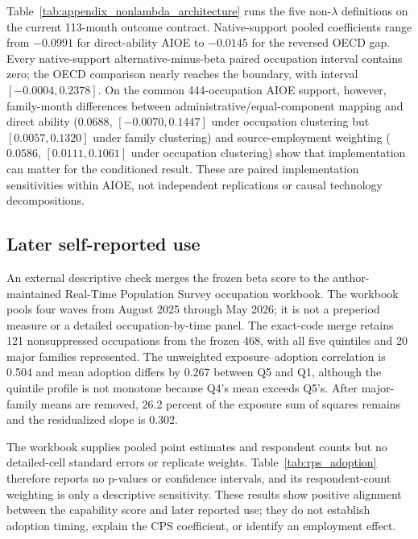 Table~\ref{tab:appendix_nonlambda_architecture} runs the five non-$\lambda$ definitions on the current 113-month outcome contract.  Native-support pooled coefficients range from $-0.0991$ for direct-ability AIOE to $-0.0145$ for the reversed OECD gap.  Every native-support alternative-minus-beta paired occupation interval contains zero; the OECD comparison nearly reaches the boundary, with interval $[-0.0004,0.2378]$.  On the common 444-occupation AIOE support, however, family-month differences between administrative/equal-component mapping and direct ability ($0.0688$, $[-0.0070,0.1447]$ under occupation clustering but $[0.0057,0.1320]$ under family clustering) and source-employment weighting ($0.0586$, $[0.0111,0.1061]$ under occupation clustering) show that implementation can matter for the conditioned result.  These are paired implementation sensitivities within AIOE, not independent replications or causal technology decompositions.









\subsection{Later self-reported use}

An external descriptive check merges the frozen beta score to the author-maintained Real-Time Population Survey occupation workbook.  The workbook pools four waves from August 2025 through May 2026; it is not a preperiod measure or a detailed occupation-by-time panel.  The exact-code merge retains 121 nonsuppressed occupations from the frozen 468, with all five quintiles and 20 major families represented.  The unweighted exposure--adoption correlation is 0.504 and mean adoption differs by 0.267 between Q5 and Q1, although the quintile profile is not monotone because Q4's mean exceeds Q5's.  After major-family means are removed, 26.2 percent of the exposure sum of squares remains and the residualized slope is 0.302.

The workbook supplies pooled point estimates and respondent counts but no detailed-cell standard errors or replicate weights.  Table~\ref{tab:rps_adoption} therefore reports no p-values or confidence intervals, and its respondent-count weighting is only a descriptive sensitivity.  These results show positive alignment between the capability score and later reported use; they do not establish adoption timing, explain the CPS coefficient, or identify an employment effect.

